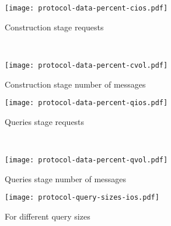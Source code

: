 \newlength{\hardcodedheighto}
\newlength{\askipo}
\newlength{\bskipo}
\newlength{\blskipo}

\setlength{\hardcodedheighto}{135pt}
\setlength{\askipo}{-10pt}
\setlength{\bskipo}{0pt}
\setlength{\blskipo}{-5pt}

\begin{figure*}[ht!]	
	\captionsetup{justification=centering}
	\centering
	\begin{minipage}{0.66\textwidth}
		\captionsetup[subfigure]{justification=centering}
		\centering
		\begin{subfigure}[t]{0.5\textwidth}
			\centering
			\texttt{[image: protocol-data-percent-cios.pdf]}
			\setlength{\abovecaptionskip}{\askipo}
			\setlength{\belowcaptionskip}{\bskipo}
			\caption{Construction stage {\IO} requests}\label{fig:protocols-data-percent:cios}
		\end{subfigure}%
		~ %
		\begin{subfigure}[t]{0.5\textwidth}
			\centering
			\texttt{[image: protocol-data-percent-cvol.pdf]}
			\setlength{\abovecaptionskip}{\askipo}
			\setlength{\belowcaptionskip}{\bskipo}
			\caption{Construction stage number of messages}\label{fig:protocols-data-percent:cvol}
		\end{subfigure}%
	
		\begin{subfigure}[t]{0.5\textwidth}
			\centering
			\texttt{[image: protocol-data-percent-qios.pdf]}
			\setlength{\abovecaptionskip}{\askipo}
			\setlength{\belowcaptionskip}{\blskipo}
			\caption{Queries stage {\IO} requests}\label{fig:protocols-data-percent:qios}
		\end{subfigure}%
		~ %
		\begin{subfigure}[t]{0.5\textwidth}
			\centering
			\texttt{[image: protocol-data-percent-qvol.pdf]}
			\setlength{\abovecaptionskip}{\askipo}
			\setlength{\belowcaptionskip}{\blskipo}
			\caption{Queries stage number of messages}\label{fig:protocols-data-percent:qvol}
		\end{subfigure}%
		\caption{Protocol scalability}\label{fig:protocols-data-percent}
	\end{minipage}%
	\begin{minipage}{.33\textwidth}
		\captionsetup[subfigure]{justification=centering}
		\centering
		\begin{subfigure}[t]{\textwidth}
			\centering
			\setlength{\abovecaptionskip}{-0pt}
			\setlength{\belowcaptionskip}{\bskipo}
			\texttt{[image: protocol-query-sizes-ios.pdf]}
			\caption{For different query sizes}\label{fig:protocols-query-sizes}
		\end{subfigure}%


\end{minipage}
\end{figure*}

